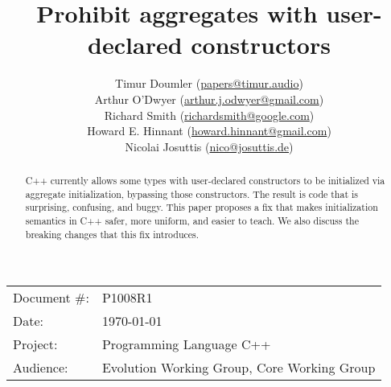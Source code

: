 
\nobibintoc


\title{Prohibit aggregates with user-declared constructors}
\author{
Timur Doumler \small(\href{mailto:papers@timur.audio}{papers@timur.audio}) 
\\Arthur O'Dwyer \small(\href{mailto:arthur.j.odwyer@gmail.com}{arthur.j.odwyer@gmail.com})
\\Richard Smith \small(\href{mailto:richardsmith@google.com}{richardsmith@google.com})
\\Howard E. Hinnant \small(\href{mailto:howard.hinnant@gmail.com}{howard.hinnant@gmail.com})
\\Nicolai Josuttis \small(\href{mailto:nico@josuttis.de}{nico@josuttis.de}\vspace{-6ex})
}
\date{}
\maketitle


\begin{tabular}{ll}
Document \#: & P1008R1 \\
Date: & \today \\
Project: & Programming Language C++ \\
Audience: & Evolution Working Group, Core Working Group
\end{tabular}


\begin{abstract}
C++ currently allows some types with user-declared constructors to be initialized via aggregate initialization, bypassing those constructors. The result is code that is surprising, confusing, and buggy. This paper proposes a fix that makes initialization semantics in C++ safer, more uniform, and easier to teach. We also discuss the breaking changes that this fix introduces.
\end{abstract}




